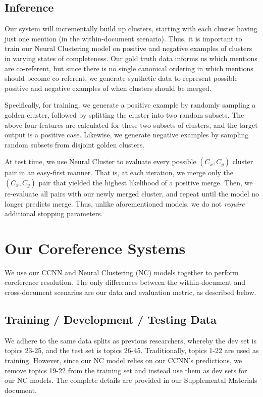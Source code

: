 \subsection{Inference}
Our system will incrementally build up clusters, starting with each cluster having just one mention (in the within-document scenario).  Thus, it is important to train our Neural Clustering model on positive and negative examples of clusters in varying states of completeness.  Our gold truth data informs us which mentions are co-referent, but since there is no single canonical ordering in which mentions should become co-referent, we generate synthetic data to represent possible positive and negative examples of when clusters should be merged.

Specifically, for training, we generate a positive example by randomly sampling a golden cluster, followed by splitting the cluster into two random subsets.  The above four features are calculated for these two subsets of clusters, and the target output is a positive case.  Likewise, we generate negative examples by sampling random subsets from disjoint golden clusters.

At test time, we use Neural Cluster to evaluate every possible $(C_x, C_y)$ cluster pair in an easy-first manner.  That is, at each iteration, we merge only the $(C_x,C_y)$ pair that yielded the highest likelihood of a positive merge.  Then, we re-evaluate all pairs with our newly merged cluster, and repeat until the model no longer predicts merge.  Thus, unlike aforementioned models, we do not \textit{require} additional stopping parameters.

\section{Our Coreference Systems}
\label{sec:coreference}

We use our CCNN and Neural Clustering (NC) models together to perform coreference resolution. The only differences between the within-document and cross-document scenarios are our data and evaluation metric, as described below.

\subsection{Training / Development / Testing Data}
We adhere to the same data splits as previous researchers, whereby the dev set is topics 23-25, and the test set is topics 26-45.  Traditionally, topics 1-22 are used as training.  However, since our NC model relies on our CCNN's predictions, we remove topics 19-22 from the training set and instead use them as dev sets for our NC models.  The complete details are provided in our Supplemental Materials document.

